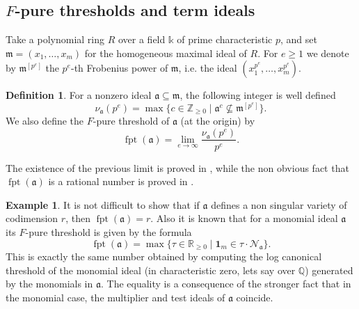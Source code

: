 \documentclass[12pt]{amsart}
\theoremstyle{definition}
\newtheorem{definition}[theorem]{Definition}
\newtheorem{example}[theorem]{Example}
\numberwithin{equation}{subsection}
\DeclareMathOperator{\fpt}{fpt}
\newcommand{\lct}{{\operatorname{lct}}}
\newcommand{\QQ}{\mathbb{Q}}
\newcommand{\RR}{\mathbb{R}}
\newcommand{\m}{\mathfrak{m}}
\newcommand{\fa}{\mathfrak{a}}
\newcommand{\N}{\mathcal{N}}
\renewcommand{\!}[1]{{\color{red}\text{\Huge$\star$ }#1}}
\begin{document}
\subsection{$F$-pure thresholds and term ideals }

Take a polynomial ring $R$ over a field $\mathbb{k}$ of prime characteristic $p$, and set $\m=(x_1, \ldots, x_m)$ for the homogeneous maximal ideal of $R$. For $e\geq 1$ we denote by $\m^{[p^{e}]}$ the $p^{e}$-th Frobenius power of $\m$, i.e. the ideal $(x_1^{p^e}, \ldots, x_m^{p^e})$.

\begin{definition}\label{Def:fpt}
	For a nonzero ideal $\fa \subseteq \m$, the following integer is well defined 
	\[\nu_{\mathfrak{a}}(p^e)= \max \{c \in \mathbb{Z}_{\geq 0} \mid \mathfrak{a}^c \not \subseteq \m^{[p^{e}]}\}.
	\]
	We also define the $F$-pure threshold of $\mathfrak{a}$ (at the origin) by
	\[\fpt(\mathfrak{a})= \lim\limits_{e \rightarrow \infty} {\frac{\nu_{\mathfrak{a}}(p^e)}{p^e}}.
	\]
\end{definition}
The existence of the previous limit is proved in \cite{MTW}, while the non obvious fact that $\fpt(\fa)$ is a rational number is proved in \cite{BMS-MMJ}. 
\begin{example}\label{Ex:Fthrsholds}
 It is not difficult to show that if $\fa$ defines a non singular variety of codimension $r$, then $\fpt(\fa) = r$. Also it is known \cite{How,HaYo} that for a monomial ideal $\fa$ its $F$-pure threshold is given by the formula 
 \[\fpt(\fa)=\max \{\tau \in \RR_{\geq 0}\mid \boldsymbol{1}_m \in \tau\cdot \N_{\fa}\}.\] 
 This is exactly the same number obtained by computing the log canonical threshold of the monomial ideal (in characteristic zero, lets say over $\QQ$) generated by the monomials in $\fa$. The equality is a consequence of the stronger fact that in the monomial case, the multiplier and test ideals of $\fa$ coincide.
 \end{example}

\end{document}
